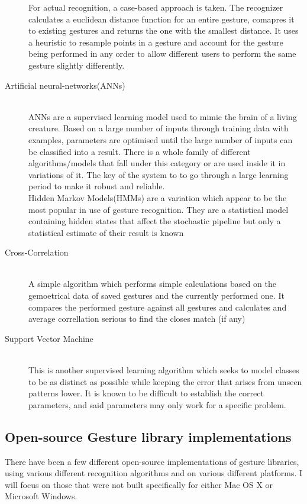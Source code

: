 \documentclass[a4paper]{article}
\begin{document}
\begin{description}
{For actual recognition, a case-based approach is taken. The recognizer calculates a euclidean distance function for an entire gesture, comapres it to existing gestures and returns the one with the smallest distance. It uses a heuristic to resample points in a gesture and account for the gesture being performed in any order to allow different users to perform the same gesture slightly differently.
}
\item[Artificial neural-networks(ANNs)]{\hfill \\
ANNs are a supervised learning model used to mimic the brain of a living creature. Based on a large number of inputs through training data with examples, parameters are optimised until the large number of inputs can be classified into a result. There is a whole family of different algorithms/models that fall under this category or are used inside it in variations of it. The key of the system to to go through a large learning period to make it robust and reliable.\\
Hidden Markov Models(HMMs) are a variation which appear to be the most popular in use of gesture recognition. They are a statistical model containing hidden states that affect the stochastic pipeline but only a statistical estimate of their result is known
}
\item[Cross-Correlation]{\hfill \\
A simple algorithm which performs simple calculations based on the gemoetrical data of saved gestures and the currently performed one. It compares the performed gesture against all gestures and calculates and average correllation serious to find the closes match (if any)}
\item[Support Vector Machine]{\hfill \\
This is another supervised learning algorithm which seeks to model classes to be as distinct as possible while keeping the error that arises from unseen patterns lower. It is known to be difficult to establish the correct parameters, and said parameters may only work for a specific problem.
}
\end{description}
\newpage
\subsection{Open-source Gesture library implementations}
There have been a few different open-source implementations of gesture libraries, using various different recognition algorithms and on various different platforms. I will focus on those that were not built specifically for either Mac OS X or Microsoft Windows. 
\end{document}
